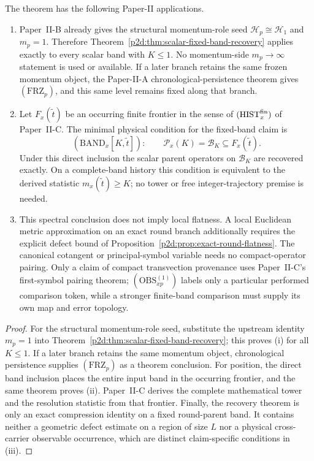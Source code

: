 \documentclass[12pt,a4paper]{article}
\begin{document}
\begin{corollary}
\label{p2d:cor:physical-level-recovery-handoff}
The theorem has the following Paper-II applications.
\begin{enumerate}[label=(\roman*),leftmargin=2em]
\item Paper~II-B already gives the structural momentum-role seed
\(\mathcal H_p\cong\mathcal H_1\) and \(m_p=1\).  Therefore
Theorem~\ref{p2d:thm:scalar-fixed-band-recovery} applies exactly to every
scalar band with \(K\le1\).  No momentum-side \(m_p\to\infty\) statement is
used or available.  If a later branch retains the same frozen momentum
object, the Paper-II-A chronological-persistence theorem gives
\((\mathrm{FRZ}_p)\), and this same level remains fixed along that branch.
\item Let \(F_x(\widetilde t)\) be an occurring finite frontier in the sense
of \((\mathrm{HIST}_x^{\rm fin})\) of Paper~II-C.  The minimal physical
condition for the fixed-band claim is
\[
 (\mathrm{BAND}_x[K,\widetilde t]):
 \qquad \mathcal P_x(K)=\mathcal B_K\subseteq F_x(\widetilde t).
\]
Under this direct inclusion the scalar parent operators on \(\mathcal B_K\)
are recovered exactly.  On a complete-band history this condition is
equivalent to the derived statistic \(m_x(\widetilde t)\ge K\); no tower or
free integer-trajectory premise is needed.
\item This spectral conclusion does not imply local flatness.  A local
Euclidean metric approximation on an exact round branch additionally requires
the explicit defect bound of
Proposition~\ref{p2d:prop:exact-round-flatness}.  The canonical cotangent or
principal-symbol variable needs no compact-operator pairing.  Only a claim of
compact transvection provenance uses Paper~II-C's
first-symbol pairing theorem; \((\mathrm{OBS}^{(1)}_{xp})\) labels only a
particular performed comparison token, while a stronger finite-band
comparison must supply its own map and error topology.
\end{enumerate}
\end{corollary}

\begin{proof}
For the structural momentum-role seed, substitute the upstream identity \(m_p=1\)
into Theorem~\ref{p2d:thm:scalar-fixed-band-recovery}; this proves (i) for
all \(K\le1\).  If a later branch retains the same momentum object,
chronological persistence supplies \((\mathrm{FRZ}_p)\) as a theorem
conclusion.  For position, the direct band inclusion
places the entire input band in the occurring frontier, and the same theorem
proves (ii).  Paper~II-C derives the complete mathematical tower and the
resolution statistic from that frontier.  Finally, the recovery theorem is
only an exact compression identity on a fixed round-parent band.  It contains
neither a geometric defect estimate on a region of size \(L\) nor a physical
cross-carrier observable occurrence, which are distinct claim-specific
conditions in (iii).
\end{proof}
\end{document}
